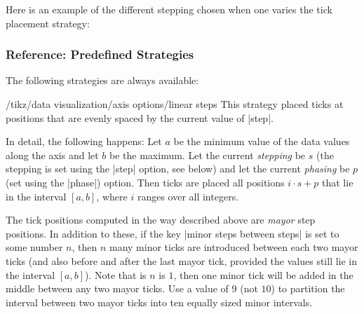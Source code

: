 Here is an example of the different stepping chosen when one varies
the tick placement strategy:

\begin{codeexample}[]
\qquad
{}
\end{codeexample}


\subsubsection{Reference: Predefined Strategies}

The following strategies are always available:

\begin{key}{/tikz/data visualization/axis options/linear steps}
  This strategy placed ticks at positions that are evenly spaced by
  the current value of |step|.

  In detail, the following happens: Let $a$ be the minimum value of the
  data values along the axis and let $b$ be the maximum. Let the
  current \emph{stepping} be $s$ (the stepping is set using the |step|
  option, see below) and let the current \emph{phasing} be $p$ (set
  using the |phase|) option. Then ticks are placed all positions
  $i\cdot s + p$ that lie in the interval $[a,b]$, where $i$ ranges
  over all integers.

  The tick positions computed in the way described above are
  \emph{mayor} step positions. In addition to these, if the key
  |minor steps between steps| is set to some number $n$, then $n$ many
  minor ticks are introduced between each two mayor ticks (and also
  before and after the last mayor tick, provided the values still lie
  in the interval $[a,b]$). Note that is $n$ is $1$, then one minor tick
  will be added in the middle between any two mayor ticks. Use a value
  of $9$ (not $10$) to partition the interval between two mayor ticks
  into ten equally sized minor intervals.

\begin{codeexample}[]
\end{codeexample}
\end{key}

